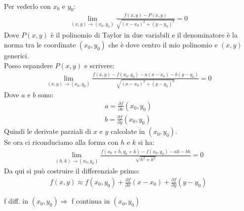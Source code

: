 \documentclass[a4paper, oneside]{article}
\begin{document}
\begin{definition}
            \hfil\\
            Per vederlo con $x_0$ e $y_0$:\\
            \begin{gather*}
                \lim_{(x,y) \to (x_0,y_0)} \frac{f(x,y) -P(x,y)}{\sqrt{(x-x_0)^2+(y-y_0)^2}} = 0
            \end{gather*}
            Dove $P(x,y)$ è il polinomio di Taylor in due variabili e il denominatore è la norma tra le coordinate $(x_0,y_0)$ che è dove centro il mio polinomio e $(x,y)$ generici.\\
            Posso espandere $P(x,y)$ e scrivere:
            \begin{gather*}
                \lim_{(x,y) \to (x_0,y_0)} \frac{f(x,y) -f(x_0,y_0) - a(x-x_0) - b(y-y_0)}{\sqrt{(x-x_0)^2+(y-y_0)^2}} = 0
            \end{gather*}
            Dove $a$ e $b$ sono:
            \begin{gather*}
                a = \frac{\partial f}{\partial x}(x_0,y_0)\\
                b = \frac{\partial f}{\partial y}(x_0,y_0)
            \end{gather*}
            Quindi le derivate parziali di $x$ e $y$ calcolate in $(x_0,y_0)$.\\
            Se ora ci riconduciamo alla forma con $h$ e $k$ si ha:
            \begin{gather*}
                \lim_{(h,k) \to (x_0,y_0)} \frac{f(x_0 +h,y_0 +k) -f(x_0,y_0) - ah - bh}{\sqrt{h^2+k^2}} = 0
            \end{gather*}
            Da qui si può costruire il differenziale primo:
            \begin{gather*}
                f(x,y) \approx f(x_0,y_0) + \frac{\partial f}{\partial x}(x-x_0) + \frac{\partial f}{\partial y}(y-y_0)
            \end{gather*}
        \end{definition}
        \begin{observation}
            f diff. in $(x_0,y_0) \Rightarrow $ f continua in $(x_0,y_0)$\\
        \end{observation}
\end{document}
